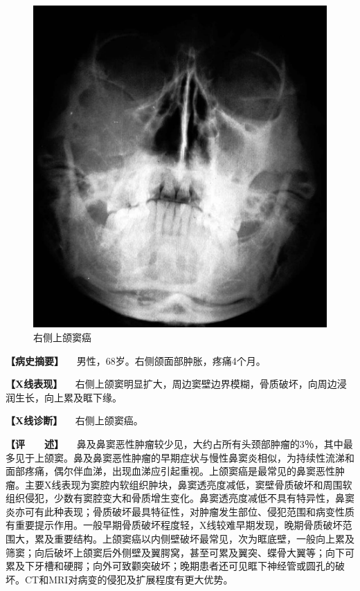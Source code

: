 \begin{figure}[!htbp]
 \centering
 \includegraphics{./images/Image00433.jpg}
 \captionsetup{justification=centering}
 \caption{右侧上颌窦癌}
 \label{fig7-4-7}
  \end{figure} 

\textbf{【病史摘要】} 　男性，68岁。右侧颌面部肿胀，疼痛4个月。

\textbf{【X线表现】}
　右侧上颌窦明显扩大，周边窦壁边界模糊，骨质破坏，向周边浸润生长，向上累及眶下缘。

\textbf{【X线诊断】} 　右侧上颌窦癌。

\textbf{【评　　述】}
　鼻及鼻窦恶性肿瘤较少见，大约占所有头颈部肿瘤的3％，其中最多见于上颌窦。鼻及鼻窦恶性肿瘤的早期症状与慢性鼻窦炎相似，为持续性流涕和面部疼痛，偶尔伴血涕，出现血涕应引起重视。上颌窦癌是最常见的鼻窦恶性肿瘤。主要X线表现为窦腔内软组织肿块，鼻窦透亮度减低，窦壁骨质破坏和周围软组织侵犯，少数有窦腔变大和骨质增生变化。鼻窦透亮度减低不具有特异性，鼻窦炎亦可有此种表现；骨质破坏最具特征性，对肿瘤发生部位、侵犯范围和病变性质有重要提示作用。一般早期骨质破坏程度轻，X线较难早期发现，晚期骨质破坏范围大，累及重要结构。上颌窦癌以内侧壁破坏最常见，次为眶底壁，一般向上累及筛窦；向后破坏上颌窦后外侧壁及翼腭窝，甚至可累及翼突、蝶骨大翼等；向下可累及下牙槽和硬腭；向外可致颧突破坏；晚期患者还可见眶下神经管或圆孔的破坏。CT和MRI对病变的侵犯及扩展程度有更大优势。

